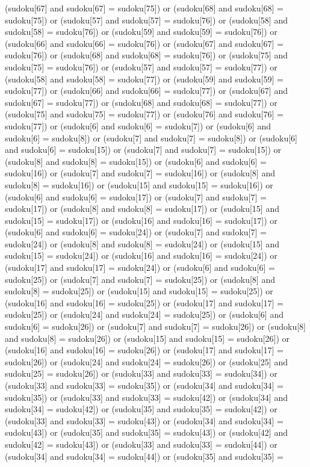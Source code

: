 \documentclass[8pt]{article}
\begin{document}
\begin{algorithm}[H]
(sudoku[67]  and sudoku[67] = sudoku[75]) or (sudoku[68]  and sudoku[68] = sudoku[75]) or (sudoku[57]  and sudoku[57] = sudoku[76]) or (sudoku[58]  and sudoku[58] = sudoku[76]) or (sudoku[59]  and sudoku[59] = sudoku[76]) or (sudoku[66]  and sudoku[66] = sudoku[76]) or (sudoku[67]  and sudoku[67] = sudoku[76]) or (sudoku[68]  and sudoku[68] = sudoku[76]) or (sudoku[75]  and sudoku[75] = sudoku[76]) or (sudoku[57]  and sudoku[57] = sudoku[77]) or (sudoku[58]  and sudoku[58] = sudoku[77]) or (sudoku[59]  and sudoku[59] = sudoku[77]) or (sudoku[66]  and sudoku[66] = sudoku[77]) or (sudoku[67]  and sudoku[67] = sudoku[77]) or (sudoku[68]  and sudoku[68] = sudoku[77]) or (sudoku[75]  and sudoku[75] = sudoku[77]) or (sudoku[76]  and sudoku[76] = sudoku[77]) or (sudoku[6]  and sudoku[6] = sudoku[7]) or (sudoku[6]  and sudoku[6] = sudoku[8]) or (sudoku[7]  and sudoku[7] = sudoku[8]) or (sudoku[6]  and sudoku[6] = sudoku[15]) or (sudoku[7]  and sudoku[7] = sudoku[15]) or (sudoku[8]  and sudoku[8] = sudoku[15]) or (sudoku[6]  and sudoku[6] = sudoku[16]) or (sudoku[7]  and sudoku[7] = sudoku[16]) or (sudoku[8]  and sudoku[8] = sudoku[16]) or (sudoku[15]  and sudoku[15] = sudoku[16]) or (sudoku[6]  and sudoku[6] = sudoku[17]) or (sudoku[7]  and sudoku[7] = sudoku[17]) or (sudoku[8]  and sudoku[8] = sudoku[17]) or (sudoku[15]  and sudoku[15] = sudoku[17]) or (sudoku[16]  and sudoku[16] = sudoku[17]) or (sudoku[6]  and sudoku[6] = sudoku[24]) or (sudoku[7]  and sudoku[7] = sudoku[24]) or (sudoku[8]  and sudoku[8] = sudoku[24]) or (sudoku[15]  and sudoku[15] = sudoku[24]) or (sudoku[16]  and sudoku[16] = sudoku[24]) or (sudoku[17]  and sudoku[17] = sudoku[24]) or (sudoku[6]  and sudoku[6] = sudoku[25]) or (sudoku[7]  and sudoku[7] = sudoku[25]) or (sudoku[8]  and sudoku[8] = sudoku[25]) or (sudoku[15]  and sudoku[15] = sudoku[25]) or (sudoku[16]  and sudoku[16] = sudoku[25]) or (sudoku[17]  and sudoku[17] = sudoku[25]) or (sudoku[24]  and sudoku[24] = sudoku[25]) or (sudoku[6]  and sudoku[6] = sudoku[26]) or (sudoku[7]  and sudoku[7] = sudoku[26]) or (sudoku[8]  and sudoku[8] = sudoku[26]) or (sudoku[15]  and sudoku[15] = sudoku[26]) or (sudoku[16]  and sudoku[16] = sudoku[26]) or (sudoku[17]  and sudoku[17] = sudoku[26]) or (sudoku[24]  and sudoku[24] = sudoku[26]) or (sudoku[25]  and sudoku[25] = sudoku[26]) or (sudoku[33]  and sudoku[33] = sudoku[34]) or (sudoku[33]  and sudoku[33] = sudoku[35]) or (sudoku[34]  and sudoku[34] = sudoku[35]) or (sudoku[33]  and sudoku[33] = sudoku[42]) or (sudoku[34]  and sudoku[34] = sudoku[42]) or (sudoku[35]  and sudoku[35] = sudoku[42]) or (sudoku[33]  and sudoku[33] = sudoku[43]) or (sudoku[34]  and sudoku[34] = sudoku[43]) or (sudoku[35]  and sudoku[35] = sudoku[43]) or (sudoku[42]  and sudoku[42] = sudoku[43]) or (sudoku[33]  and sudoku[33] = sudoku[44]) or (sudoku[34]  and sudoku[34] = sudoku[44]) or (sudoku[35]  and sudoku[35] = 
\end{algorithm}
\end{document}
